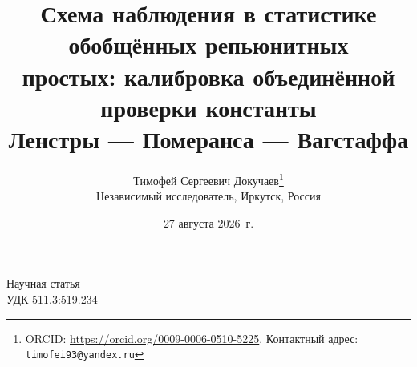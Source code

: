 \documentclass[11pt,a4paper]{article}
\title{Схема наблюдения в статистике обобщённых репьюнитных\\
простых: калибровка объединённой проверки константы\\
Ленстры --- Померанса --- Вагстаффа}
\author{Тимофей Сергеевич Докучаев\thanks{ORCID: \url{https://orcid.org/0009-0006-0510-5225}.
Контактный адрес: \texttt{timofei93@yandex.ru}}\\
\small Независимый исследователь, Иркутск, Россия}
\date{27 августа 2026~г.}
\theoremstyle{plain}
\theoremstyle{remark}
\begin{document}
\noindent Научная статья\\
\noindent УДК 511.3:519.234
\medskip

\let\RHnewpage\newpage
\let\newpage\relax
\maketitle
\let\newpage\RHnewpage
\end{document}
